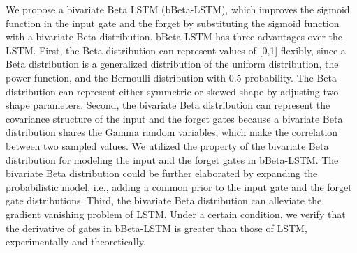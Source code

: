 \documentclass[letterpaper]{article} %
\begin{document}
We propose a bivariate Beta LSTM (bBeta-LSTM), which improves the sigmoid function in the input gate and the forget by substituting the sigmoid function with a bivariate Beta distribution. bBeta-LSTM has three advantages over the LSTM. First, the Beta distribution can represent values of [0,1] flexibly, since a Beta distribution is a generalized distribution of the uniform distribution, the power function, and the Bernoulli distribution with 0.5 probability. The Beta distribution can represent either symmetric or skewed shape by adjusting two shape parameters.
Second, the bivariate Beta distribution can represent the covariance structure of the input and the forget gates because a bivariate Beta distribution shares the Gamma random variables, which make the correlation between two sampled values. We utilized the property of the bivariate Beta distribution for modeling the input and the forget gates in bBeta-LSTM.
The bivariate Beta distribution could be further elaborated by expanding the probabilistic model, i.e., adding a common prior to the input gate and the forget gate distributions.
Third, the bivariate Beta distribution can alleviate the gradient vanishing problem of LSTM. Under a certain condition, we verify that the derivative of gates in bBeta-LSTM is greater than those of LSTM, experimentally and theoretically.
\end{document}
